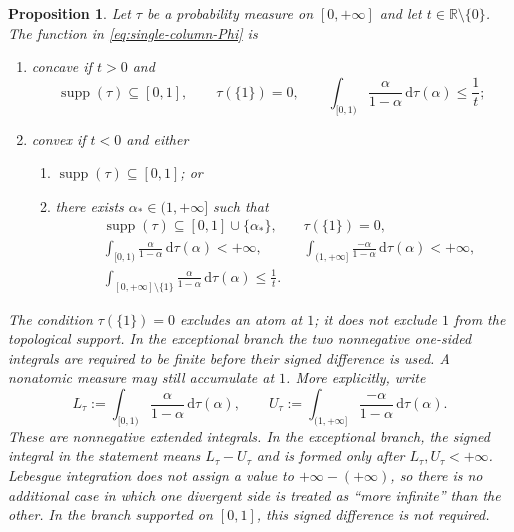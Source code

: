\documentclass[aps,pra,11pt,onecolumn,nofootinbib,tightenlines]{revtex4-2}
\newtheorem{proposition}[theorem]{Proposition}
\theoremstyle{definition}
\begin{document}
\begin{proposition}
\label{prop:general-sufficient}
Let $\tau$ be a probability measure on $[0,+\infty]$ and let $t\in\mathbb R\setminus\{0\}$. The function in \eqref{eq:single-column-Phi} is
\begin{enumerate}
 \item concave if $t>0$ and
 \begin{equation}
  \operatorname{supp}(\tau)\subseteq[0,1],
  \qquad
  \tau(\{1\})=0,
  \qquad
  \int_{[0,1)}\frac{\alpha}{1-\alpha}\,\mathrm d\tau(\alpha)
  \leq\frac1t;
  \label{eq:general-positive-condition}
 \end{equation}
 \item convex if $t<0$ and either
 \begin{enumerate}
  \item $\operatorname{supp}(\tau)\subseteq[0,1]$; or
  \item there exists $\alpha_*\in(1,+\infty]$ such that
  \begin{equation}
   \begin{aligned}
   &\operatorname{supp}(\tau)\subseteq[0,1]\cup\{\alpha_*\},
   &&\tau(\{1\})=0,\\
   &\int_{[0,1)}\frac{\alpha}{1-\alpha}\,\mathrm d\tau(\alpha)<+\infty,
   &&\int_{(1,+\infty]}\frac{-\alpha}{1-\alpha}\,\mathrm d\tau(\alpha)<+\infty,\\
   &\int_{[0,+\infty]\setminus\{1\}}
   \frac{\alpha}{1-\alpha}\,\mathrm d\tau(\alpha)
   \leq\frac1t.
   \end{aligned}
   \label{eq:general-negative-condition}
  \end{equation}
 \end{enumerate}
\end{enumerate}
The condition $\tau(\{1\})=0$ excludes an atom at $1$; it does not exclude $1$ from the topological support. In the exceptional branch the two nonnegative one-sided integrals are required to be finite before their signed difference is used. A nonatomic measure may still accumulate at $1$.
More explicitly, write
\begin{equation}
 L_\tau:=\int_{[0,1)}\frac{\alpha}{1-\alpha}\,\mathrm d\tau(\alpha),
 \qquad
 U_\tau:=\int_{(1,+\infty]}\frac{-\alpha}{1-\alpha}\,\mathrm d\tau(\alpha).
 \label{eq:one-sided-moments-definition}
\end{equation}
These are nonnegative extended integrals.  In the exceptional branch, the
signed integral in the statement means $L_\tau-U_\tau$ and is formed only after
$L_\tau,U_\tau<+\infty$.  Lebesgue integration does not assign a value to
$+\infty-(+\infty)$, so there is no additional case in which one divergent
side is treated as ``more infinite'' than the other.  In the branch supported
on $[0,1]$, this signed difference is not required.
\end{proposition}
\end{document}
